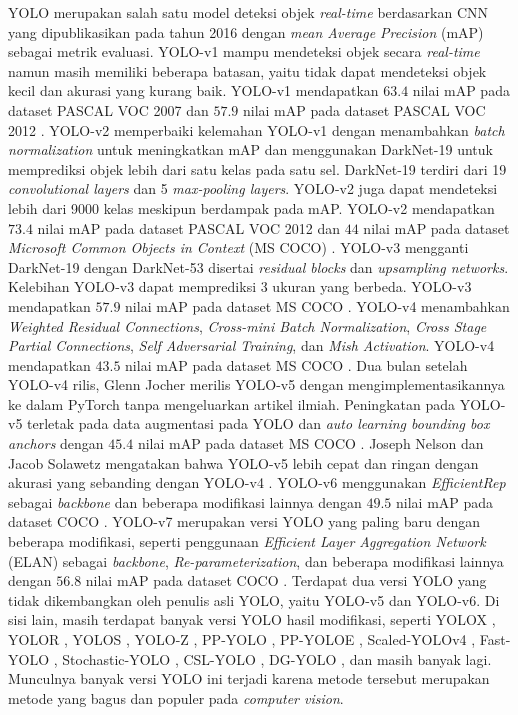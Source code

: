     YOLO merupakan salah satu model deteksi objek \textit{real-time} berdasarkan CNN yang dipublikasikan pada tahun 2016 dengan \textit{mean Average Precision} (mAP) sebagai metrik evaluasi. YOLO-v1 mampu mendeteksi objek secara \textit{real-time} namun masih memiliki beberapa batasan, yaitu tidak dapat mendeteksi objek kecil dan akurasi yang kurang baik. YOLO-v1 mendapatkan $63.4$ nilai mAP pada dataset PASCAL VOC 2007 dan $57.9$ nilai mAP pada dataset PASCAL VOC 2012 \citep{Redmon2016a}. YOLO-v2 memperbaiki kelemahan YOLO-v1 dengan menambahkan \textit{batch normalization} untuk meningkatkan mAP dan menggunakan DarkNet-19 untuk memprediksi objek lebih dari satu kelas pada satu sel. DarkNet-19 terdiri dari 19 \textit{convolutional layers} dan 5 \textit{max-pooling layers}. YOLO-v2 juga dapat mendeteksi lebih dari 9000 kelas meskipun berdampak pada mAP. YOLO-v2 mendapatkan $73.4$ nilai mAP pada dataset PASCAL VOC 2012 dan $44$ nilai mAP pada dataset \textit{Microsoft Common Objects in Context} (MS COCO) \citep{Redmon2017}. YOLO-v3 mengganti DarkNet-19 dengan DarkNet-53 disertai \textit{residual blocks} dan \textit{upsampling networks}. Kelebihan YOLO-v3 dapat memprediksi 3 ukuran yang berbeda. YOLO-v3 mendapatkan $57.9$ nilai mAP pada dataset MS COCO \citep{Redmon2018}. YOLO-v4 menambahkan \textit{Weighted Residual Connections}, \textit{Cross-mini Batch Normalization}, \textit{Cross Stage Partial Connections}, \textit{Self Adversarial Training}, dan \textit{Mish Activation}. YOLO-v4 mendapatkan $43.5$ nilai mAP pada dataset MS COCO \citep{Bochkovskiy2020}. Dua bulan setelah YOLO-v4 rilis, Glenn Jocher merilis YOLO-v5 dengan mengimplementasikannya ke dalam PyTorch tanpa mengeluarkan artikel ilmiah. Peningkatan pada YOLO-v5 terletak pada data augmentasi pada YOLO dan \textit{auto learning bounding box anchors} dengan $45.4$ nilai mAP pada dataset MS COCO \citep{Jocher2020}. Joseph Nelson dan Jacob Solawetz mengatakan bahwa YOLO-v5 lebih cepat dan ringan dengan akurasi yang sebanding dengan YOLO-v4 \citep{Nelson2020}. YOLO-v6 menggunakan \textit{EfficientRep} sebagai \textit{backbone} dan beberapa modifikasi lainnya dengan $49.5$ nilai mAP pada dataset COCO \citep{Li2022}. YOLO-v7 merupakan versi YOLO yang paling baru dengan beberapa modifikasi, seperti penggunaan \textit{Efficient Layer Aggregation Network} (ELAN) sebagai \textit{backbone}, \textit{Re-parameterization}, dan beberapa modifikasi lainnya dengan $56.8$ nilai mAP pada dataset COCO \citep{Wang2022}. Terdapat dua versi YOLO yang tidak dikembangkan oleh penulis asli YOLO, yaitu YOLO-v5 dan YOLO-v6. Di sisi lain, masih terdapat banyak versi YOLO hasil modifikasi, seperti YOLOX \citep{Ge2021}, YOLOR \citep{Zhu2021a}, YOLOS \citep{Wolf2020a}, YOLO-Z \citep{Benjumea2021}, PP-YOLO \citep{Long2020}, PP-YOLOE \citep{Xu2022}, Scaled-YOLOv4 \citep{ScaledYOLOv4Wang2021}, Fast-YOLO \citep{Shaifee2017}, Stochastic-YOLO \cite{Azevedo2020}, CSL-YOLO \citep{Zhang2021b}, DG-YOLO \citep{Liu2020}, dan masih banyak lagi. Munculnya banyak versi YOLO ini terjadi karena metode tersebut merupakan metode yang bagus dan populer pada \textit{computer vision}.

